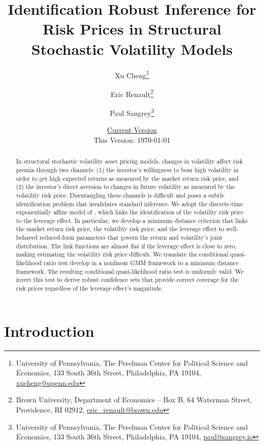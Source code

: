 \documentclass[11pt, letterpaper, twoside]{article}
\author{Xu Cheng\thanks{University of Pennsylvania, The Perelman Center for Political Science and Economics, 133 South 36th Street, Philadelphia, PA 19104, \href{mailto:xucheng@upenn.edu}{xucheng@upenn.edu}} \and Eric Renault\thanks{Brown University, Department of Economics -- Box B, 64 Waterman Street, Providence, RI 02912, \href{mailto:eric_renault@brown.edu}{eric\_renault@brown.edu}} \and Paul Sangrey\thanks{University of Pennsylvania, The Perelman Center for Political Science and Economics, 133 South 36th Street, Philadelphia, PA 19104, \href{mailto:paul@sangrey.io}{paul@sangrey.io}}}
\title{Identification Robust Inference for Risk Prices in Structural Stochastic Volatility Models}
\date{\href{http://sangrey.io/risk_price_inference.pdf}{Current Version} \protect\\ This Version: \today}
\begin{document}
\begin{titlepage}


\maketitle
\thispagestyle{empty}
\addtocounter{page}{-1}

\begin{abstract} 

\singlespacing \noindent 
In structural stochastic volatility asset pricing models, changes in volatility affect risk premia through two channels: (1) the investor's willingness to bear high volatility in order to get high expected returns as measured by the market return risk price, and (2) the investor’s direct aversion to changes in future volatility as measured by the volatility risk price. Disentangling these channels is difficult and poses a subtle identification problem that invalidates standard inference. We adopt the discrete-time exponentially affine model of \textcite{han2018leverage}, which links the identification of the volatility risk price to the leverage effect. In particular, we develop a minimum distance criterion that links the market return risk price, the volatility risk price, and the leverage effect to well-behaved reduced-form parameters that govern the return and volatility's joint distribution. The link functions are almost flat if the leverage effect is close to zero, making estimating the volatility risk price difficult. We translate the conditional quasi-likelihood ratio test \textcite{andrews2016conditional} develop in a nonlinear GMM framework to a minimum distance framework. The resulting conditional quasi-likelihood ratio test is uniformly valid. We invert this test to derive robust confidence sets that provide correct coverage for the risk prices regardless of the leverage effect's magnitude. 

\end{abstract} 

\medskip
{}

\medskip


\end{titlepage}

\clearpage

\section{Introduction}
\end{document}
